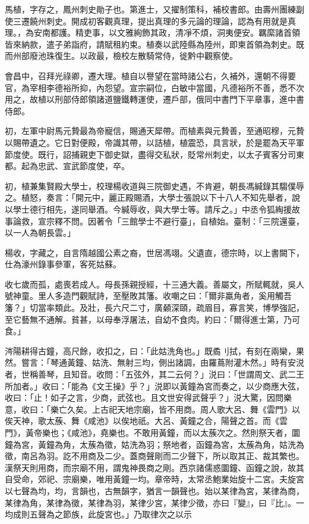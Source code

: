 
\begin{pinyinscope}

 馬植，字存之，鳳州刺史勛子也。第進士，又擢制策科，補校書郎。由壽州團練副使三遷饒州刺史。開成初客觀真理，提出真理的多元論的理論，認為有用就是真理。，為安南都護。精吏事，以文雅絢飾其政，清凈不煩，洞夷便安。羈縻諸首領皆來納款，遣子弟詣府，請賦租約束。植奏以武陸縣為陸州，即柬首領為刺史。既而州部廢池珠復生。以政最，檢校左散騎常侍，徙黔中觀察使。



 會昌中，召拜光祿卿，遷大理。植自以譽望在當時諸公右，久補外，還朝不得要官，為宰相李德裕所抑，內怨望。宣宗嗣位，白敏中當國，凡德裕所不善，悉不次用之，故植以刑部侍郎領諸道鹽鐵轉運使，遷戶部，俄同中書門下平章事，進中書侍郎。



 初，左軍中尉馬元贄最為帝寵信，賜通天犀帶。而植素與元贄善，至通昭穆，元贄以賜帶遺之。它日對便殿，帝識其帶，以詰植，植震恐，具言狀，於是罷為天平軍節度使。既行，詔捕親吏下御史獄，盡得交私狀，貶常州刺史，以太子賓客分司東都。起為忠武、宣武節度使，卒。



 初，植兼集賢殿大學士，校理楊收道與三院御史遇，不肯避，朝長馮緘錄其騶僕辱之。植怒，奏言：「開元中，麗正殿賜酒，大學士張說以下十八人不知先舉者，說以學士德行相先，遂同舉酒。今緘辱收，與大學士等。請斥之。」中丞令狐綯援故事論救，宣宗釋不問。因著令「三館學士不避行臺」，自植始。臺制：「三院還臺，以一人為朝長雲。」



 楊收，字藏之，自言隋越國公素之裔，世居馮翊。父遺直，德宗時，以上書闕下，仕為濠州錄事參軍，客死姑蘇。



 收七歲而孤，處喪若成人。母長孫親授經，十三通大義。善屬文，所賦輒就，吳人號神童。里人多造門觀賦詩，至壓敗其籓。收嘲之曰：「爾非羸角者，奚用觸吾籓？」切當率類此。及壯，長六尺二寸，廣顙深頤，疏眉目，寡言笑，博學強記，至它藝無不通解。貧甚，以母奉浮屠法，自幼不食肉。約曰：「爾得進士第，乃可食。」



 涔陽耕得古鐘，高尺餘，收扣之，曰：「此姑洗角也。」既矞刂拭，有刻在兩欒，果然。嘗言：「琴通黃鐘、姑洗、無射三均，側出諸調，由羅蔦附灌木然。」時有安涚者，世稱善琴，且知音。收問：「五弦外，其二云何？」涚曰：「世謂周文、武二王所加者。」收曰：「能為《文王操》乎？」涚即以黃鐘為宮而奏之，以少商應大弦，收曰：「止！如子之言，少商，武弦也。且文世安得武聲乎？」涚大驚，因問樂意，收曰：「樂亡久矣。上古祀天地宗廟，皆不用商。周人歌大呂、舞《雲門》以俟天神，歌太蔟、舞《咸池》以俟地祇。大呂、黃鐘之合，陽聲之首。而《雲門》，黃帝樂也；《咸池》，堯樂也。不敢用黃鐘，而以太蔟次之。然則祭天者，圜鐘為宮，黃鐘為角，太蔟為徵，姑洗為羽；祭地者，函鐘為宮，太蔟為角，姑洗為徵，南呂為羽。訖不用商及二少。蓋商聲剛而二少聲下，所以取其正、裁其繁也。漢祭天則用商，而宗廟不用，謂鬼神畏商之剛。西京諸儒惑圜鐘、函鐘之說，故其自受命，郊祀、宗廟樂，唯用黃鐘一均。章帝時，太常丞鮑業始旋十二宮。夫旋宮以七聲為均，均，言韻也，古無韻字，猶言一韻聲也。始以某律為宮，某律為商，某律為角，某律為徵，某律為羽，某律少宮，某律少徵，亦曰『變』，曰『比』。一均成則五聲為之節族，此旋宮也。」乃取律次之以示




\end{pinyinscope}
